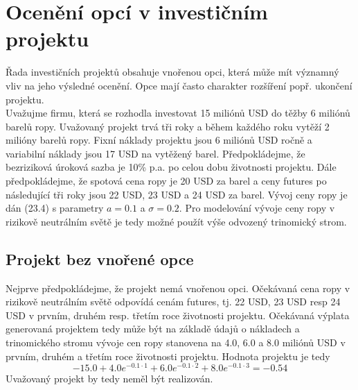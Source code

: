 \documentclass[a4paper]{book}
\begin{document}
\section{Ocenění opcí v investičním projektu}

Řada investičních projektů obsahuje vnořenou opci, která může mít významný vliv na jeho výsledné ocenění. Opce mají často charakter rozšíření popř. ukončení projektu.\\

Uvažujme firmu, která se rozhodla investovat 15 miliónů USD do těžby 6 miliónů barelů ropy. Uvažovaný projekt trvá tři roky a během každého roku vytěží 2 milióny barelů ropy. Fixní náklady projektu jsou 6 miliónů USD ročně a variabilní náklady jsou 17 USD na vytěžený barel. Předpokládejme, že bezriziková úroková sazba je 10\% p.a. po celou dobu životnosti projektu. Dále předpokládejme, že spotová cena ropy je 20 USD za barel a ceny futures po následující tři roky jsou 22 USD, 23 USD a 24 USD za barel. Vývoj ceny ropy je dán (23.4) s parametry $a = 0.1$ a $\sigma = 0.2$. Pro modelování vývoje ceny ropy v rizikově neutrálním světě je tedy možné použít výše odvozený trinomický strom.

\subsection{Projekt bez vnořené opce}

Nejprve předpokládejme, že projekt nemá vnořenou opci. Očekávaná cena ropy v rizikově neutrálním světě odpovídá cenám futures, tj. 22 USD, 23 USD resp 24 USD v prvním, druhém resp. třetím roce životnosti projektu. Očekávaná výplata generovaná projektem tedy může být na základě údajů o nákladech a trinomického stromu vývoje cen ropy stanovena na 4.0, 6.0 a 8.0 miliónů USD v prvním, druhém a třetím roce životnosti projektu. Hodnota projektu je tedy
\begin{equation*}
-15.0 + 4.0e^{-0.1 \cdot 1} + 6.0e^{-0.1 \cdot 2} + 8.0e^{-0.1 \cdot 3} = -0.54
\end{equation*}
Uvažovaný projekt by tedy neměl být realizován.
\end{document}
